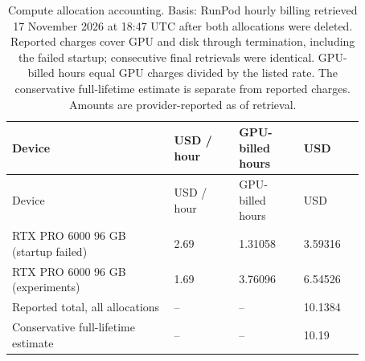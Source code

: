 \begin{longtable}{@{}L{0.4\linewidth}L{0.16\linewidth}L{0.16\linewidth}L{0.15\linewidth}@{}}
\caption{Compute allocation accounting. Basis: RunPod hourly billing retrieved 17 November 2026 at 18:47 UTC after both allocations were deleted. Reported charges cover GPU and disk through termination, including the failed startup; consecutive final retrievals were identical. GPU-billed hours equal GPU charges divided by the listed rate. The conservative full-lifetime estimate is separate from reported charges. Amounts are provider-reported as of retrieval.}\\
\toprule
Device & USD / hour & GPU-billed hours & USD \\
\midrule
\endfirsthead
\toprule
Device & USD / hour & GPU-billed hours & USD \\
\midrule
\endhead
\endfoot
\bottomrule
\endlastfoot
RTX PRO 6000 96 GB (startup failed) & 2.69 & 1.31058 & 3.59316 \\
RTX PRO 6000 96 GB (experiments) & 1.69 & 3.76096 & 6.54526 \\
Reported total, all allocations & -- & -- & 10.1384 \\
Conservative full-lifetime estimate & -- & -- & 10.19 \\
\end{longtable}
